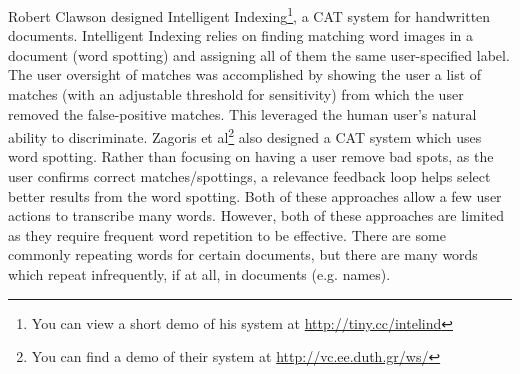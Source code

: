 \documentclass[conference]{IEEEtran}
\begin{document}
{Robert Clawson designed Intelligent Indexing\cite{Clawson2014}\footnote{You can view a short demo of his system at \url{http://tiny.cc/intelind}}, a CAT system for handwritten documents. Intelligent Indexing relies on finding matching word images in a document (word spotting) and assigning all of them the same user-specified label.
The user oversight of matches was accomplished by showing the user a list of matches (with an adjustable threshold for sensitivity) from which the user removed the false-positive matches. This leveraged the human user's natural ability to discriminate. Zagoris et al\cite{Zagoris2015}\footnote{You can find a demo of their system at \url{http://vc.ee.duth.gr/ws/}} also designed a CAT system which uses word spotting. Rather than focusing on having a user remove bad spots, as the user confirms correct matches/spottings, a relevance feedback loop helps select better results from the word spotting. Both of these approaches allow a few user actions to transcribe many words. However, both of these approaches are limited as they require frequent word repetition to be effective. There are some commonly repeating words for certain documents, but there are many words which repeat infrequently, if at all, in documents (e.g. names).


%

}
\end{document}
